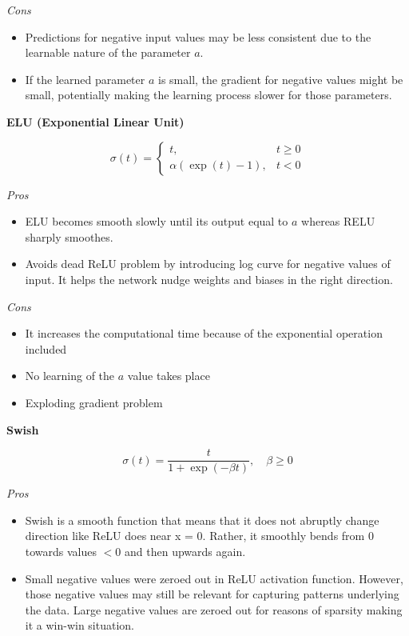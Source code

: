 \textit{Cons}

\begin{itemize}
\item Predictions for negative input values may be less consistent due to the learnable nature of the parameter \(a\).
\item If the learned parameter \(a\) is small, the gradient for negative values might be small, potentially making the learning process slower for those parameters.
\end{itemize}
\textbf{ELU (Exponential Linear Unit)}

$$
\sigma(t)=
\left\{
  \begin{array}{ll}
  t, & t\geq 0 \\
  \alpha(\exp(t)-1), & t<0
  \end{array}
\right.  
$$

\textit{Pros}

\begin{itemize}
  \item ELU becomes smooth slowly until its output equal to $a$ whereas RELU sharply smoothes.
  \item Avoids dead ReLU problem by introducing log curve for negative values of
input. It helps the network nudge weights and biases in the right direction.
\end{itemize}

\textit{Cons}

\begin{itemize}
  \item It increases the computational time because of the exponential operation
included
  \item No learning of the $a$ value takes place
  \item Exploding gradient problem
\end{itemize}

\textbf{Swish}

$$\sigma(t)=\displaystyle \frac{t}{1+\exp(-\beta t)}, \quad \beta \geq 0$$

\textit{Pros}

\begin{itemize}
  \item Swish is a smooth function that means that it does not abruptly change
direction like ReLU does near x = 0. Rather, it smoothly bends from 0 towards
values $< 0$ and then upwards again.
  \item Small negative values were zeroed out in ReLU activation function. However,
those negative values may still be relevant for capturing patterns underlying
the data. Large negative values are zeroed out for reasons of sparsity making it a win-win situation.
\end{itemize}

